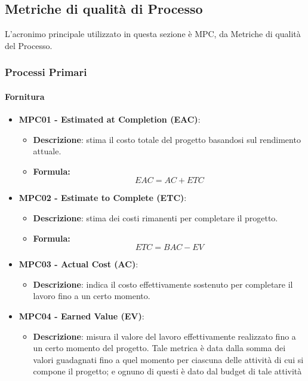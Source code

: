 \documentclass[10pt]{article}
\begin{document}
\begin{justify}
\subsection{Metriche di qualità di Processo}
L'acronimo principale utilizzato in questa sezione è MPC, da Metriche di qualità del Processo.

\subsubsection{Processi Primari}
\paragraph{Fornitura}
\begin{itemize}
    \item \textbf{MPC01 - Estimated at Completion (EAC)}:
    \begin{itemize}
        \item   \textbf{Descrizione}: stima il costo totale del progetto basandosi sul rendimento attuale.
        \item   \textbf{Formula:}
                \[
                EAC = AC + ETC
                \]
    \end{itemize}
    \item \textbf{MPC02 - Estimate to Complete (ETC)}:
    \begin{itemize}
        \item   \textbf{Descrizione}: stima dei costi rimanenti per completare il progetto.
        \item   \textbf{Formula:}
                \[
                ETC = BAC - EV
                \]
    \end{itemize}
    \item \textbf{MPC03 - Actual Cost (AC)}:
    \begin{itemize}
        \item \textbf{Descrizione}: indica il costo effettivamente sostenuto per completare il lavoro fino a un certo momento.
    \end{itemize}
    \item \textbf{MPC04 - Earned Value (EV)}:
        \begin{itemize}
            \item \textbf{Descrizione}: misura il valore del lavoro effettivamente realizzato fino a un certo momento del progetto. Tale metrica è data dalla somma
            dei valori guadagnati fino a quel momento per ciascuna delle attività di cui si compone il progetto; e ognuno di questi è dato dal budget di tale attività

\end{itemize}
\end{itemize}
\end{justify}
\end{document}
